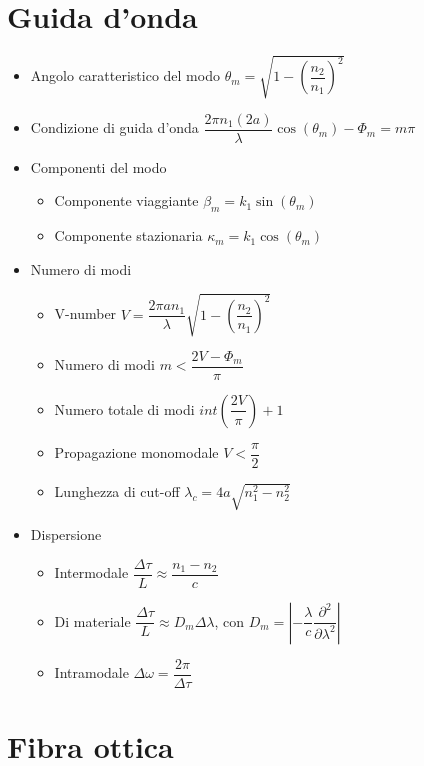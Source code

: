 \documentclass{article}
\begin{document}
\section{Guida d'onda}
\begin{itemize}
  \item Angolo caratteristico del modo \( \theta_m = \sqrt{1 - \left(\dfrac{n_2}{n_1} \right) ^ 2} \)
  \item Condizione di guida d'onda \( \dfrac{2 \pi n_1 (2 a)}{\lambda} \cos(\theta_m) - \Phi_m = m \pi \)
  \item Componenti del modo
        \begin{itemize}
          \item Componente viaggiante \( \beta_m = k_1 \sin(\theta_m)\)
          \item Componente stazionaria \( \kappa_m = k_1 \cos(\theta_m) \)
        \end{itemize}
  \item Numero di modi
        \begin{itemize}
          \item V-number \(\displaystyle V = \dfrac{2 \pi a n_1}{\lambda} \sqrt{1 - \left(\dfrac{n_2}{n_1}\right) ^ 2} \)
          \item Numero di modi \( m < \dfrac{2V - \Phi_m}{\pi} \)
          \item Numero totale di modi \( int\left(\dfrac{2V}{\pi} \right) + 1 \)
          \item Propagazione monomodale \( V < \dfrac{\pi}{2} \)
          \item Lunghezza di cut-off \( \displaystyle \lambda_c = 4a \sqrt{n_1^2 - n_2^2} \)
        \end{itemize}
  \item Dispersione
        \begin{itemize}
          \item Intermodale \( \dfrac{\Delta \tau}{L} \approx \dfrac{n_1 - n_2}{c} \)
          \item Di materiale \( \dfrac{\Delta \tau}{L} \approx D_m \Delta \lambda \), con \( D_m = \left| -\dfrac{\lambda}{c} \dfrac{\partial ^ 2}{\partial \lambda ^ 2} \right| \)
          \item Intramodale \( \Delta \omega = \dfrac{2 \pi}{\Delta \tau} \)
        \end{itemize}
\end{itemize}

\newpage

\section{Fibra ottica}
\end{document}

